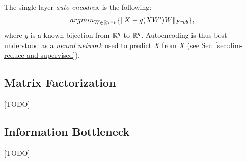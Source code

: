 \documentclass[12pt,a4paper]{article}
\begin{document}
The single layer \emph{auto-encodres}, is the following:
\begin{align}
	\textstyle{\mathop{argmin}_{W\in \mathbb{R}^{q\times p}}}\{ \Vert X- g(XW')W \Vert_{Frob} \},
\end{align}
where $g$ is a known bijection from $\mathbb{R}^q$ to $\mathbb{R}^q$.
Autoencoding is thus best understood as a \emph{neural network} used to predict $X$ from $X$ (see Sec~\ref{sec:dim-reduce-and-supervised}).







\subsection{Matrix Factorization}
\label{sec:matrix_factorization}
[TODO]



\subsection{Information Bottleneck}
[TODO]

%
%
%
\end{document}
